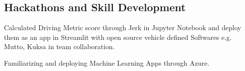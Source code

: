 \documentclass[a4paper,12pt]{article}
\begin{document}
\vspace*{6pt}
\subsection{{Hackathons and Skill Development}}
\vspace*{5pt}
\begin{zitemize}
\item[] Calculated Driving Metric score through Jerk in Jupyter Notebook and deploy them as an app in Streamlit with open source vehicle defined Softwares e.g. Mutto, Kuksa in team collaboration.
\end{zitemize}
\vspace*{4pt}
\begin{zitemize}
\item[] Familiarizing and deploying Machine Learning Apps through Azure.
\end{zitemize}

\end{document}
